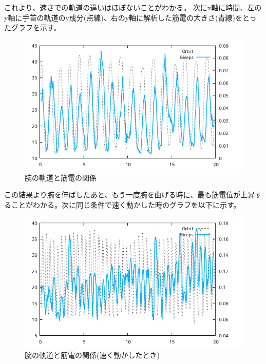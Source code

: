 \documentclass{jsarticle}
\begin{document}
これより、速さでの軌道の違いはほぼないことがわかる。
次にx軸に時間、左のy軸に手首の軌道のy成分(点線)、右のy軸に解析した筋電の大きさ(青線)をとったグラフを示す。
\begin{figure}[h]
  \begin{center}
    \includegraphics[clip,width=150mm]{Graph_4.png}
    \caption{腕の軌道と筋電の関係 \label{fig:3}}
  \end{center}
\end{figure}

この結果より腕を伸ばしたあと、もう一度腕を曲げる時に、最も筋電位が上昇することがわかる。次に同じ条件で速く動かした時のグラフを以下に示す。
\begin{figure}[h]
  \begin{center}
    \includegraphics[clip,width=150mm]{Graph_5.png}
    \caption{腕の軌道と筋電の関係(速く動かしたとき) \label{fig:4}}
  \end{center}
  
\end{figure}
\end{document}
